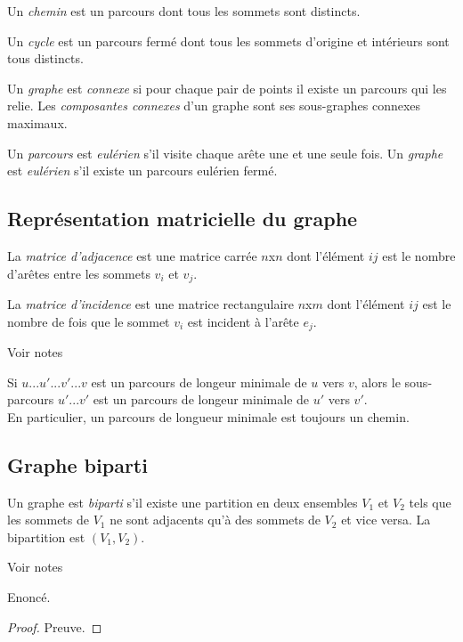 \begin{mydef}
  Un \emph{chemin} est un parcours dont tous les sommets sont distincts.
\end{mydef}

\begin{mydef}
  Un \emph{cycle} est un parcours fermé dont tous les sommets d'origine et intérieurs sont tous distincts.
\end{mydef}

\begin{mydef}
  Un \emph{graphe} est \emph{connexe} si pour chaque pair de points il existe un parcours qui les relie. Les \emph{composantes connexes} d'un graphe sont ses sous-graphes connexes maximaux.
\end{mydef}

\begin{mydef}
  Un \emph{parcours} est \emph{eulérien} s'il visite chaque arête une et une seule fois. Un \emph{graphe} est \emph{eulérien} s'il existe un parcours eulérien fermé.
\end{mydef}

\subsection{Représentation matricielle du graphe}
\begin{mydef}
  La \emph{matrice d'adjacence} est une matrice carrée $n$x$n$ dont l'élément $ij$ est le nombre d'arêtes entre les sommets $v_i$ et $v_j$.
\end{mydef}

\begin{mydef}
  La \emph{matrice d'incidence} est une matrice rectangulaire $n$x$m$ dont l'élément $ij$ est le nombre de fois que le sommet $v_i$ est incident à l'arête $e_j$.
\end{mydef}

\begin{myexem}
  Voir notes
\end{myexem}

\begin{mylem}
  Si $u...u'...v'...v$ est un parcours de longeur minimale de $u$ vers $v$, alors le sous-parcours $u'...v'$ est un parcours de longeur minimale de $u'$ vers $v'$.\\
  En particulier, un parcours de longueur minimale est toujours un chemin.
\end{mylem}

\subsection{Graphe biparti}
\begin{mydef}
  Un graphe est \emph{biparti}  s'il existe une partition en deux ensembles $V_1$ et $V_2$ tels que les sommets de $V_1$ ne sont adjacents qu'à des sommets de $V_2$ et vice versa. La bipartition est $(V_1, V_2)$.
\end{mydef}

\begin{myexem}
  Voir notes
\end{myexem}

\begin{mytheo}
  Enoncé.
  \begin{proof}
    Preuve.
  \end{proof}
\end{mytheo}
